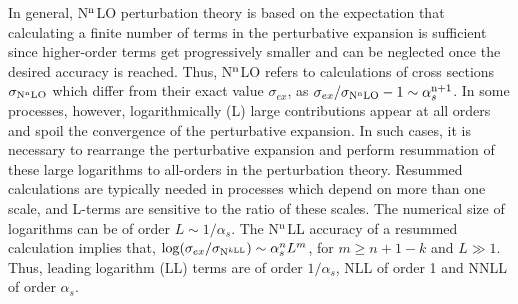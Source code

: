 In general,  N$^{\rm n}$LO  perturbation theory   is based on the expectation  that  calculating   a finite number of terms in the perturbative expansion is sufficient  since higher-order terms get progressively smaller and can be neglected once the desired accuracy is reached.  Thus, N$^{\rm n}$LO refers to calculations  of  cross sections $\sigma_{{\rm N}^{\rm n}{\rm LO}}$   which differ from their exact  value $\sigma_{ex}$, as  $\sigma_{ex}/\sigma_{{\rm N}^{\rm n}{\rm LO}}-1\sim \alpha_s^{{\rm n}+1}$.    In some processes, however,  logarithmically  (L) large  contributions appear at all orders  and spoil the convergence of the perturbative expansion.  In such cases,  it is necessary to rearrange   the perturbative expansion and perform resummation of these large logarithms to  all-orders in the perturbation theory.
Resummed calculations are typically needed in processes which depend on more than one scale,  and   L-terms are sensitive to the ratio of these scales. The numerical size of  logarithms can be of  order $L\sim 1/\alpha_s$. The  N$^{\rm n}$LL  accuracy of a resummed calculation  implies that, $\log(\sigma_{ex}/\sigma_{{\rm N}^{k{\rm LL}}})\sim \alpha_s^{n}L^{m}$, for  $m\geq n+1-k$  and  $L \gg 1$. Thus,  leading logarithm  (LL) terms are of order $1/\alpha_s$, NLL  of order 1 and   NNLL  of order $\alpha_s$.
